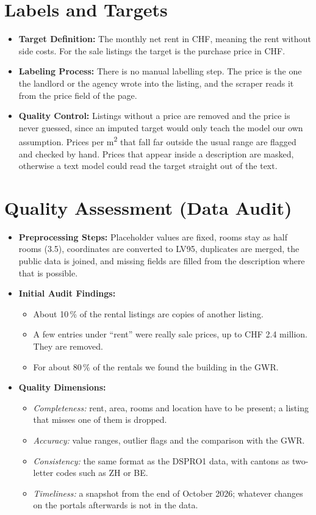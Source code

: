 \documentclass[11pt, a4paper]{article}
\begin{document}
\section{Labels and Targets}
\begin{itemize}
    \item \textbf{Target Definition:} The monthly net rent in CHF, meaning the rent without side costs. For the sale listings the target is the purchase price in CHF.
    \item \textbf{Labeling Process:} There is no manual labelling step. The price is the one the landlord or the agency wrote into the listing, and the scraper reads it from the price field of the page.
    \item \textbf{Quality Control:} Listings without a price are removed and the price is never guessed, since an imputed target would only teach the model our own assumption. Prices per m\textsuperscript{2} that fall far outside the usual range are flagged and checked by hand. Prices that appear inside a description are masked, otherwise a text model could read the target straight out of the text.
\end{itemize}

\section{Quality Assessment (Data Audit)}
\begin{itemize}
    \item \textbf{Preprocessing Steps:} Placeholder values are fixed, rooms stay as half rooms (3.5), coordinates are converted to LV95, duplicates are merged, the public data is joined, and missing fields are filled from the description where that is possible.
    \item \textbf{Initial Audit Findings:}
    \begin{itemize}
        \item About 10\,\% of the rental listings are copies of another listing.
        \item A few entries under ``rent'' were really sale prices, up to CHF 2.4 million. They are removed.
        \item For about 80\,\% of the rentals we found the building in the GWR.
    \end{itemize}
    \item \textbf{Quality Dimensions:}
    \begin{itemize}
        \item \emph{Completeness:} rent, area, rooms and location have to be present; a listing that misses one of them is dropped.
        \item \emph{Accuracy:} value ranges, outlier flags and the comparison with the GWR.
        \item \emph{Consistency:} the same format as the DSPRO1 data, with cantons as two-letter codes such as ZH or BE.
        \item \emph{Timeliness:} a snapshot from the end of October 2026; whatever changes on the portals afterwards is not in the data.
    \end{itemize}
\end{itemize}
\end{document}
